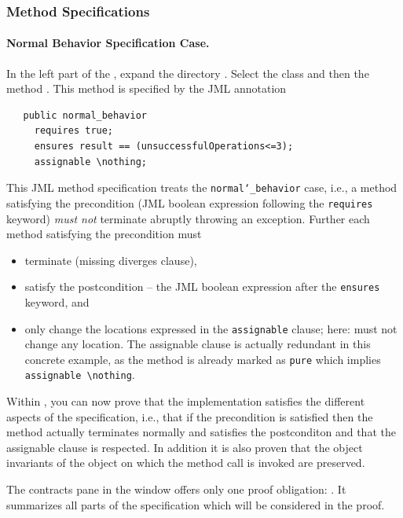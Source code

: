 \subsubsection{Method Specifications}

\paragraph{Normal Behavior Specification Case.}

In the left part of the \pob, expand the directory .
Select the class  and then the method
. This method is specified by the JML
annotation
\begin{verbatim}
   public normal_behavior
     requires true;
     ensures result == (unsuccessfulOperations<=3); 
     assignable \nothing;
\end{verbatim}

This JML method specification treats the \texttt{normal\char`\_behavior}
case, i.e., a method satisfying the precondition (JML boolean
expression following the \texttt{re\-quires} keyword) \emph{must not}
terminate abruptly throwing an exception. Further each method
satisfying the precondition must
\begin{itemize}
\item terminate (missing diverges clause),
\item satisfy the postcondition -- the JML boolean expression after
  the \texttt{ensures} keyword, and
\item only change the locations expressed in the \texttt{assignable}
  clause; here: must not change any location. The assignable clause is
  actually redundant in this concrete example, as the method is
  already marked as \texttt{pure} which implies
  \verb+assignable \nothing+.
\end{itemize}

Within \KeY, you can now prove that the implementation satisfies the
different aspects of the specification, i.e., that if the precondition
is satisfied then the method actually terminates normally and
satisfies the postconditon and that the assignable clause is
respected. In addition it is also proven that the object invariants of 
the object on which the method call is invoked are preserved.

The contracts pane in the \prm{} window offers only one proof obligation:
. 
It summarizes all parts of the specification which will be considered in the proof.


